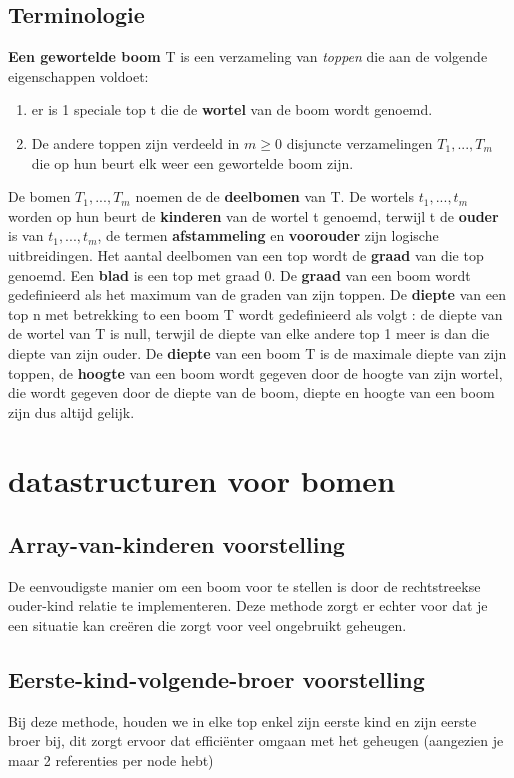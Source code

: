 \documentclass{report}
\begin{document}
	  		\subsection{Terminologie}
	  			\textbf{Een gewortelde boom} T is een verzameling van \textit{toppen} die aan de volgende eigenschappen voldoet: 
	  			\begin{enumerate}
	  				\item er is 1 speciale top t die de \textbf{wortel} van de boom wordt genoemd.
	  				\item De andere toppen zijn verdeeld in \(m \geq 0\) disjuncte verzamelingen \(T_1, ..., T_m\) die op hun beurt elk weer een gewortelde boom zijn.
	  			\end{enumerate}
  				De bomen  \(T_1, ..., T_m\) noemen de de \textbf{deelbomen} van T. De wortels \(t_1, ..., t_m\) worden op hun beurt de \textbf{kinderen} van de wortel t genoemd, terwijl t de \textbf{ouder} is van \(t_1, ..., t_m\), de termen \textbf{afstammeling} en \textbf{voorouder} zijn logische uitbreidingen. Het aantal deelbomen van een top wordt de \textbf{graad} van die top genoemd. Een \textbf{blad} is een top met graad 0. De \textbf{graad} van een boom wordt gedefinieerd als het maximum van de graden van zijn toppen. De \textbf{diepte} van een top n met betrekking to een boom T wordt gedefinieerd als volgt : de diepte van de wortel van T is null, terwjil de diepte van elke andere top 1 meer is dan die diepte van zijn ouder. De \textbf{diepte} van een boom T is de maximale diepte van zijn toppen, de \textbf{hoogte} van een boom wordt gegeven door de hoogte van zijn wortel, die wordt gegeven door de diepte van de boom, diepte en hoogte van een boom zijn dus altijd gelijk.
  		\section{datastructuren voor bomen}
  			\subsection{Array-van-kinderen voorstelling}
  				De eenvoudigste manier om een boom voor te stellen is door de rechtstreekse ouder-kind relatie te implementeren. Deze methode zorgt er echter voor dat je een situatie kan creëren die zorgt voor veel ongebruikt geheugen.
  			\subsection{Eerste-kind-volgende-broer voorstelling}
  				Bij deze methode, houden we in elke top enkel zijn eerste kind en zijn eerste broer bij, dit zorgt ervoor dat efficiënter omgaan met het geheugen (aangezien je maar 2 referenties per node hebt)
\end{document}
